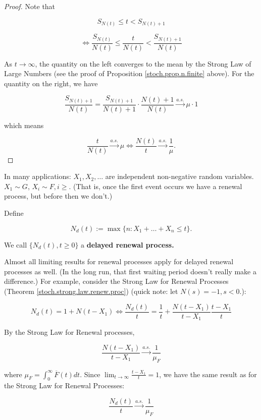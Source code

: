 \begin{proof} Note that

\[
S_{N(t)} \leq t < S_{N(t) + 1}
\]

\[
\iff \frac{S_{N(t)}}{N(t)} \leq \frac{t}{N(t)} < \frac{S_{N(t) + 1}}{N(t)}
\]

As \(t \to \infty\), the quantity on the left converges to the mean by the Strong Law of Large Numbers (see the proof of Proposition \ref{stoch.prop.n.finite} above). For the quantity on the right, we have

\[
\frac{S_{N(t) + 1}}{N(t)} = \frac{S_{N(t) + 1}}{N(t)+ 1} \cdot \frac{N(t) + 1}{N(t)} \xrightarrow{a.s.} \mu \cdot 1
\]

which means

\[
 \frac{t}{N(t)} \xrightarrow{a.s.} \mu \iff \frac{N(t)}{t} \xrightarrow{a.s.} \frac{1}{\mu}.
\]
\end{proof}

\begin{remark}In many applications: \(X_1, X_2, \ldots\) are independent non-negative random variables. \(X_1 \sim G\), \(X_i \sim F, i \geq \). (That is, once the first event occurs we have a renewal process, but before then we don't.)

\end{remark}

\begin{definition}
Define

\[
N_d(t) := \max \{n: X_1 + \ldots + X_n \leq t \}.
\]

We call \(\{N_d(t), t \geq 0\}\) a \textbf{delayed renewal process.}

\end{definition}

\begin{remark} Almost all limiting results for renewal processes apply for delayed renewal processes as well. (In the long run, that first waiting period doesn't really make a difference.) For example, consider the Strong Law for Renewal Processes (Theorem \ref{stoch.strong.law.renew.proc}) (quick note: let \(N(s)=-1, s < 0.\)):

\[
N_d(t) = 1 + N(t - X_1)  \iff \frac{N_d(t)}{t} = \frac{1}{t} + \frac{N(t - X_1)}{t-X_1} \frac{t- X_1}{t}
\]

By the Strong Law for Renewal processes,

\[
\frac{N(t - X_1)}{t-X_1} \xrightarrow{a.s.} \frac{1}{\mu_F}
\]


where \(\mu_F = \int_0^\infty \overline{F}(t) dt\). Since \(\lim_{t \to \infty} \frac{t- X_1}{t} = 1\), we have the same result as for the Strong Law for Renewal Processes:

\[
\frac{N_d(t)}{t} \xrightarrow{a.s.} \frac{1}{\mu_F}
\]


\end{remark}

